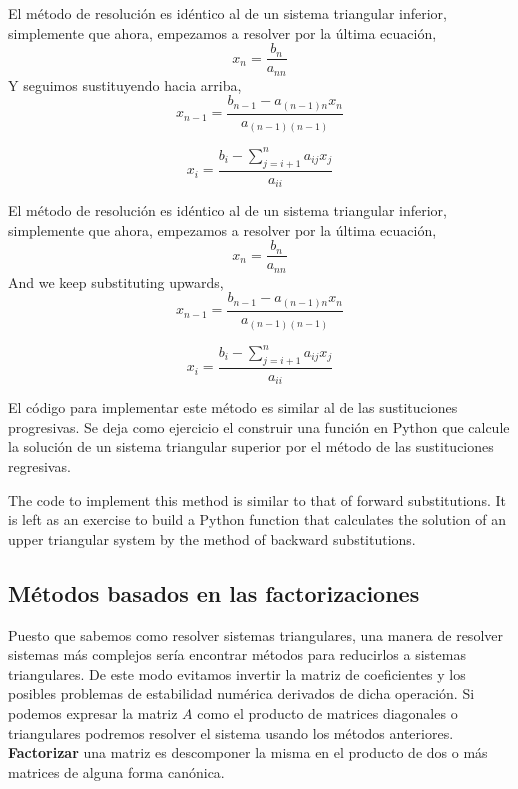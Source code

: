 \begin{paracol}{2}
    El método de resolución es idéntico al de un sistema triangular inferior, simplemente que ahora, empezamos a resolver por la última ecuación,
\begin{equation*}
x_n=\frac{b_n}{a_{nn}}
\end{equation*}
Y seguimos sustituyendo hacia arriba,
\begin{equation*}
x_{n-1}=\frac{b_{n-1}-a_{(n-1)n}x_{n}}{a_{(n-1)(n-1)}}
\end{equation*}

\begin{equation*}
x_i=\frac{b_i-\sum_{j=i+1}^{n}a_{ij}x_j}{a_{ii}}
\end{equation*}

\switchcolumn
  El método de resolución es idéntico al de un sistema triangular inferior, simplemente que ahora, empezamos a resolver por la última ecuación,
\begin{equation*}
x_n=\frac{b_n}{a_{nn}}
\end{equation*}
And we keep substituting upwards,
\begin{equation*}
x_{n-1}=\frac{b_{n-1}-a_{(n-1)n}x_{n}}{a_{(n-1)(n-1)}}
\end{equation*}

\begin{equation*}
x_i=\frac{b_i-\sum_{j=i+1}^{n}a_{ij}x_j}{a_{ii}}
\end{equation*}

\switchcolumn

El código para implementar este método es similar al de las sustituciones progresivas. Se deja como ejercicio el construir una función en Python que calcule la solución de un sistema triangular superior por el método de las sustituciones regresivas.

\switchcolumn
The code to implement this method is similar to that of forward substitutions. It is left as an exercise to build a Python function that calculates the solution of an upper triangular system by the method of backward substitutions.
\switchcolumn
\subsection{Métodos basados en las factorizaciones}
Puesto que sabemos como resolver sistemas triangulares, una manera de resolver sistemas más complejos sería encontrar métodos para reducirlos a sistemas triangulares. De este modo evitamos invertir la matriz de coeficientes y los posibles problemas de estabilidad numérica derivados de dicha operación. Si podemos expresar la matriz $A$ como el producto de matrices diagonales o triangulares podremos resolver el sistema usando los métodos anteriores. \textbf{Factorizar} una matriz es descomponer la misma en el producto de dos o más matrices de alguna forma canónica.


\end{paracol}
